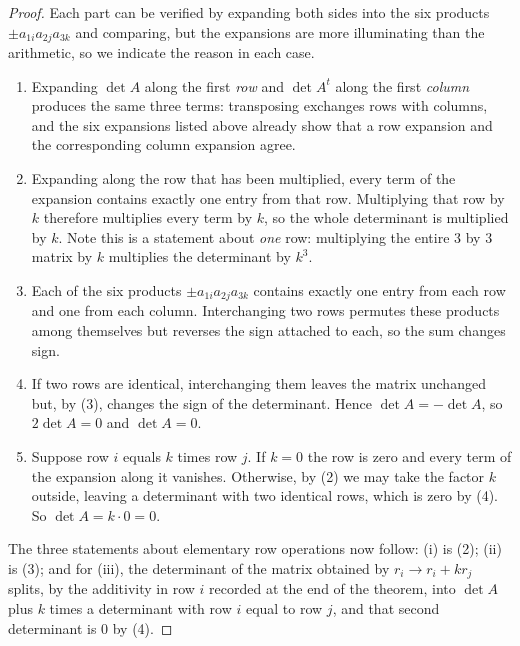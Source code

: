 \documentclass[11pt,a4paper]{article}
\theoremstyle{definition}
\begin{document}
\begin{proof}
Each part can be verified by expanding both sides into the six products
$\pm a_{1i}a_{2j}a_{3k}$ and comparing, but the expansions are more
illuminating than the arithmetic, so we indicate the reason in each case.

\begin{enumerate}
\item Expanding $\det A$ along the first \emph{row} and $\det A^t$ along the
first \emph{column} produces the same three terms: transposing exchanges rows
with columns, and the six expansions listed above already show that a row
expansion and the corresponding column expansion agree.

\item Expanding along the row that has been multiplied, every term of the
expansion contains exactly one entry from that row. Multiplying that row by $k$
therefore multiplies every term by $k$, so the whole determinant is multiplied
by $k$. Note this is a statement about \emph{one} row: multiplying the entire
$3$ by $3$ matrix by $k$ multiplies the determinant by $k^3$.

\item Each of the six products $\pm a_{1i}a_{2j}a_{3k}$ contains exactly one
entry from each row and one from each column. Interchanging two rows permutes
these products among themselves but reverses the sign attached to each, so the
sum changes sign.

\item If two rows are identical, interchanging them leaves the matrix unchanged
but, by (3), changes the sign of the determinant. Hence $\det A=-\det A$, so
$2\det A=0$ and $\det A=0$.

\item Suppose row $i$ equals $k$ times row $j$. If $k=0$ the row is zero and
every term of the expansion along it vanishes. Otherwise, by (2) we may take
the factor $k$ outside, leaving a determinant with two identical rows, which is
zero by (4). So $\det A=k\cdot 0=0$.
\end{enumerate}

The three statements about elementary row operations now follow: (i) is (2);
(ii) is (3); and for (iii), the determinant of the matrix obtained by
$r_i\rightarrow r_i+kr_j$ splits, by the additivity in row $i$ recorded at the
end of the theorem, into $\det A$ plus $k$ times a determinant with row $i$
equal to row $j$, and that second determinant is $0$ by (4).
\end{proof}
\end{document}
